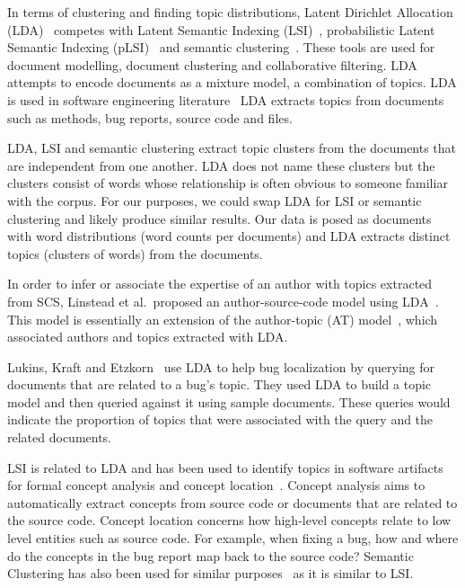 \documentclass[times, 10pt,twocolumn]{article}
\newcommand{\shrinkit}{\vspace*{-.3em}}
\begin{document}

In terms of clustering and finding topic distributions, Latent
Dirichlet Allocation (LDA)~\cite{944937} competes with Latent Semantic
Indexing
(LSI)~\cite{1374321,10.1109/ICPC.2007.13},
probabilistic Latent Semantic Indexing (pLSI)~\cite{944937} and
semantic clustering~\cite{1698774,1566153}. These tools are used for
document modelling, document clustering and collaborative
filtering. LDA attempts to encode documents as a mixture
model, a combination of topics.  LDA is used in software engineering
literature~\cite{lukins2008,10.1109/MSR.2007.20}%
LDA extracts topics from documents such as methods, bug
reports, source code and files.

LDA, LSI and semantic clustering extract topic
clusters from the documents that are independent from one another. LDA
does not name these clusters but the clusters consist of words whose
relationship is often obvious to someone familiar with the corpus. For our purposes, we
could swap LDA for LSI or semantic clustering and likely produce similar
results. Our data is posed as documents with word distributions (word
counts per documents) and LDA extracts distinct topics (clusters of
words) from the documents.

\shrinkit
{}
\shrinkit




In order to infer or associate the expertise of an author with topics
extracted from SCS, Linstead et al.\  proposed an author-source-code model
using LDA~\cite{10.1109/MSR.2007.20}.%
  This model
is essentially an extension of the author-topic (AT)
model~\cite{1036902}, which associated authors and topics extracted
with LDA.

Lukins, Kraft and Etzkorn~\cite{lukins2008} use LDA to help bug
localization by querying for documents that are related to a bug's topic. They
used LDA to build a topic model and then queried against it using
sample documents. These queries would indicate the proportion of
topics that were associated with the query and the
related documents.

LSI is related to LDA and has been used to identify topics in software
artifacts for formal concept analysis and concept
location~\cite{1374321,10.1109/ICPC.2007.13}.
Concept analysis aims to automatically extract concepts from source
code or documents that are related to the source code.  Concept location concerns how
high-level concepts relate to low level entities such as source code. For
example, when fixing a bug, how and where do the concepts in the bug
report map back to the source code?  Semantic Clustering has also been
used for similar purposes~\cite{1698774,1566153} as it is similar to
LSI.
\end{document}

